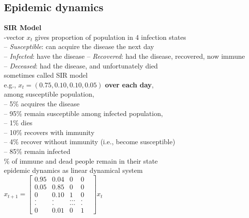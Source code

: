 \subsection{Epidemic dynamics}
\textbf{SIR Model}\\
-vector $x_t$ gives proportion of population in 4 infection states\\
-- \textit{Susceptible}: can acquire the disease the next day\\
-- \textit{Infected}: have the disease
-- \textit{Recovered}: had the disease, recovered, now immune\\
-- \textit{Deceased}: had the disease, and unfortunately died\\
\textbullet sometimes called SIR model\\
\textbullet e.g., $x_t = (0.75,0.10,0.10,0.05)$
\textbf{over each day},\\
\textbullet among susceptible population,\\
-- 5\% acquires the disease\\
-- 95\% remain susceptible
\textbullet among infected population,\\
-- 1\% dies\\
-- 10\% recovers with immunity\\
-- 4\% recover without immunity (i.e., become susceptible)\\
-- 85\% remain infected\\
\% of immune and dead people remain in their state\\
\textbullet epidemic dynamics as linear dynamical system\\
$
x_{t+1} =
\begin{bmatrix}
    0.95 &  0.04 &  0 & 0 \\
    0.05 & 0.85 & 0 & 0\\
    0 & 0.10 & 1 & 0\\
    . & . &...& . &\\
    . & . &...& . &\\
    0 & 0.01 & 0 & 1
\end{bmatrix}x_t
$\\

